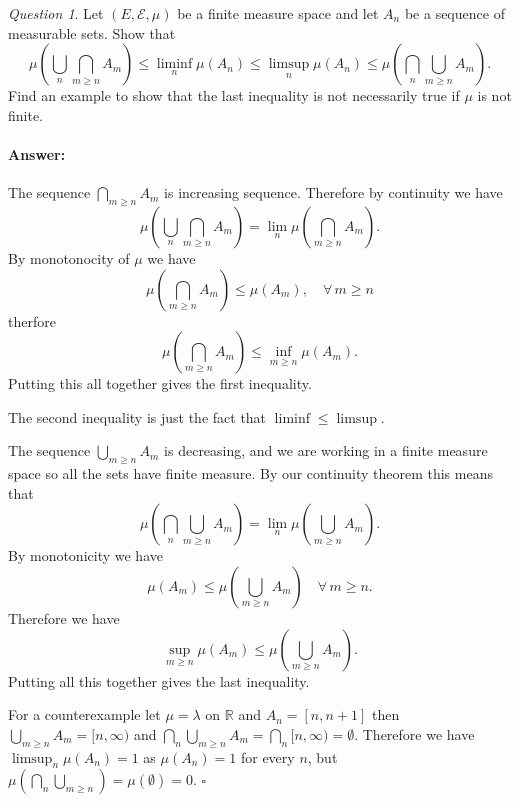 \documentclass[11pt]{article}
\theoremstyle{definition}
\theoremstyle{remark}
\newtheorem{q}{Question}
\newenvironment{ans}{\paragraph{Answer:}}{\hfill$\square$ \vspace{20pt}}
\begin{document}
\begin{q}
Let $(E, \mathcal{E}, \mu)$ be a finite measure space and let $A_n$ be a sequence of measurable sets. Show that
\[ \mu \left( \bigcup_n \bigcap_{m \geq n} A_m \right) \leq \liminf_n \mu(A_n) \leq \limsup_n \mu(A_n) \leq \mu \left( \bigcap_n \bigcup_{m \geq n} A_m\right).\] Find an example to show that the last inequality is not necessarily true if $\mu$ is not finite.
\end{q}
\begin{ans}
The sequence $\bigcap_{m \geq n} A_m$ is increasing sequence. Therefore by continuity we have
\[ \mu\left( \bigcup_n \bigcap_{m \geq n}A_m\right) = \lim_n \mu(\bigcap_{m \geq n} A_m). \] By monotonocity of $\mu$ we have
\[ \mu(\bigcap_{m \geq n}A_m) \leq \mu(A_m), \quad \forall \, m \geq n \] therfore
\[ \mu(\bigcap_{m \geq n} A_m) \leq \inf_{m \geq n} \mu(A_m). \] Putting this all together gives the first inequality. 

The second inequality is just the fact that $\liminf \leq \limsup$. 

The sequence $\bigcup_{m \geq n} A_m$ is decreasing, and we are working in a finite measure space so all the sets have finite measure. By our continuity theorem this means that
\[ \mu \left( \bigcap_n \bigcup_{m \geq n} A_m\right) = \lim_n \mu( \bigcup_{m \geq n} A_m). \] By monotonicity we have
\[ \mu(A_m) \leq \mu \left( \bigcup_{m \geq n} A_m\right) \quad \forall \, m \geq n. \] Therefore we have
\[ \sup_{m \geq n} \mu(A_m) \leq \mu \left( \bigcup_{m \geq n} A_m\right). \] Putting all this together gives the last inequality. 

For a counterexample let $\mu = \lambda$ on $\mathbb{R}$ and  $A_n = [n,n+1]$ then $\bigcup_{m \geq n} A_m = [n, \infty)$ and $\bigcap_n \bigcup_{m \geq n} A_m = \bigcap_n [n,\infty) = \emptyset$. Therefore we have $\limsup_n \mu(A_n) = 1$ as $\mu(A_n) =1$ for every $n$, but $\mu( \bigcap_n \bigcup_{m\geq n}) = \mu(\emptyset) = 0$.
\end{ans}
\end{document}
